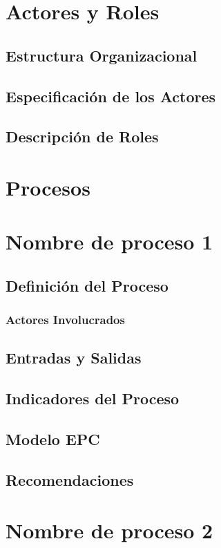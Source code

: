 \documentclass[12pt,letterpaper]{article}
\begin{document}
\section{Actores y Roles}
\subsection{Estructura Organizacional}
\subsection{Especificación de los Actores}
\subsection{Descripción de Roles}

\section{Procesos}

\section{Nombre de proceso 1}
\subsection{Definición del Proceso}
\subsubsection{Actores Involucrados}
\subsection{Entradas y Salidas}
\subsection{Indicadores del Proceso}
\subsection{Modelo EPC}
\subsection{Recomendaciones}

\section{Nombre de proceso 2}
\end{document}
